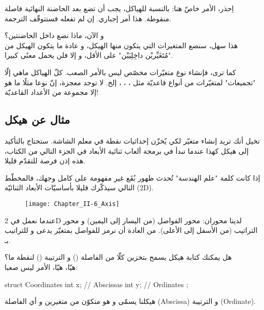 \begin{critical}
 اِحذر، الأمر خاصّ هنا: بالنسبة للهياكل، يجب أن تضع بعد الحاضنة النهائية فاصلة منقوطة. هذا أمر إجباري. إن لم تفعله فستتوقّف الترجمة.
\end{critical}

و الآن، ماذا نضع داخل الحاضنتين؟\\
هذا سهل، سنضع المتغيرات التي يتكون منها الهيكل، و عادة ما يتكون الهيكل من "مُتَغَيِّريْن داخِلِيَيْن" على الأقل، و إلا فلن يحمل معنًى كبيرا.

كما ترى، فإنشاء نوع متغيّرات مخصّص ليس بالأمر الصعب. كلّ الهياكل ماهي إلّا "تجميعات" لمتغيّرات من أنواع قاعديّة مثل
، ، ،
إلخ. لا توجد معجزة، إنّ نوعا
مثلًا ما هو إلا مجموعة من الأعداد القاعديّة!

\subsection{مثال عن هيكل}

تخيل أنك تريد إنشاء متغيّر لكي يٌخزّن إحداثيات نقطة في معلم الشاشة. ستحتاج بالتأكيد إلى هيكل كهذا عندما تبدأ في برمجة ألعاب ثنائية الأبعاد في الجزء التالي من الكتاب، هذه إذن فرصة للتقدّم قليلا.

إذا كانت كلمة "علم الهندسة" تُحدث ظهور بُقَع غير مفهومة على كامل وجهك، فالمخطّط التالي سيذكّرك قليلا بأساسيّات الأبعاد الثنائيّة (\textenglish{2D}).

\begin{figure}[H]
	\centering
	\texttt{[image: Chapter\_II-6\_Axis]}
\end{figure}

عندما نعمل في
\textenglish{2D}
لدينا محوران: محور الفواصل (من اليسار إلى اليمين) و محور التراتيب (من الأسفل إلى الأعلى). من العادة أن نرمز للفواصل بمتغيّر يدعى
و للتراتيب بـ.

هل يمكنك كتابة هيكل
يسمح بتخزين كلّا من الفاصلة
()
و الترتيبة
()
لنقطة ما؟\\
هيّا، هيّا، الأمر ليس صعبا:

\begin{Csource}
struct Coordinates
{
	int x; // Abscissas
	int y; // Ordinates
};
\end{Csource}

هيكلنا يسمّى
و هو متكوّن من متغيرين
و
أي الفاصلة
(\textenglish{Abscissa})
و الترتيبة
(\textenglish{Ordinate}).

